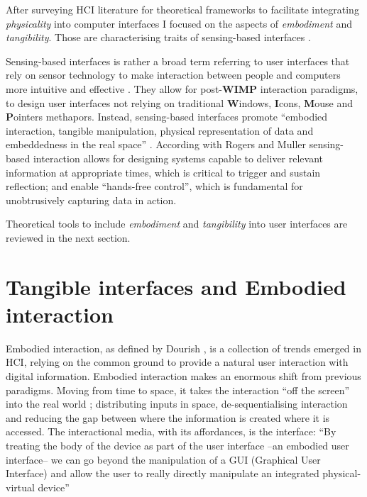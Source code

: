 After surveying HCI literature for theoretical frameworks to facilitate integrating \emph{physicality} into computer interfaces I focused on the aspects of \emph{embodiment} and \emph{tangibility}. Those are characterising traits of sensing-based interfaces \autocite{Benford:2005bo}.

Sensing-based interfaces is rather a broad term referring to user interfaces that rely on sensor technology to make interaction between people and computers more intuitive and effective \autocite{Zhai:2005jm}. They allow for post-\textbf{WIMP} \autocite{VanDam:1997tz} interaction paradigms, to design user interfaces not relying on traditional \textbf{W}indows, \textbf{I}cons, \textbf{M}ouse and \textbf{P}ointers methapors. Instead, sensing-based interfaces promote ``embodied interaction, tangible manipulation, physical representation of data and embeddedness in the real space'' \autocite{Hornecker:2006uq}. According with Rogers and Muller \autocite*{Rogers:2006te} sensing-based interaction allows for designing systems capable to deliver relevant information at appropriate times, which is critical to trigger and sustain reflection; and enable ``hands-free control'', which is fundamental for unobtrusively capturing data in action.

Theoretical tools to include \emph{embodiment} and \emph{tangibility} into user interfaces are reviewed in the next section.

\section{Tangible interfaces and Embodied interaction}\label{tangible-interfaces-and-embodied-interaction}

Embodied interaction, as defined by Dourish \autocite{Dourish:2001vc}, is a collection of trends emerged in HCI, relying on the common ground to provide a natural user interaction with digital information. Embodied interaction makes an enormous shift from previous paradigms. Moving from time to space, it takes the interaction ``off the screen'' into the real world \autocite{Dourish:2001vc}; distributing inputs in space, de-sequentialising interaction and reducing the gap between where the information is created where it is accessed. The interactional media, with its affordances, is the interface: ``By treating the body of the device as part of the user interface --an embodied user interface-- we can go beyond the manipulation of a GUI (Graphical User Interface) and allow the user to really directly manipulate an integrated physical-virtual device'' \autocite{Fishkin:2000df}

